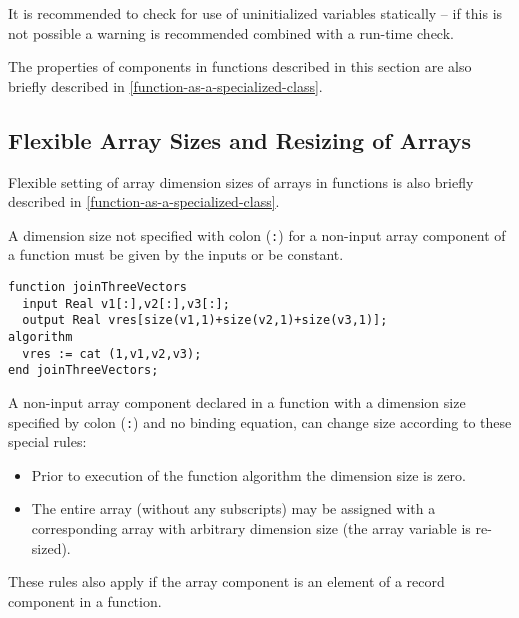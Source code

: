 \begin{nonnormative}
It is recommended to check for use of uninitialized variables statically -- if this is not possible a warning is recommended
combined with a run-time check.
\end{nonnormative}

\begin{nonnormative}
The properties of components in functions described in this
section are also briefly described in \cref{function-as-a-specialized-class}.
\end{nonnormative}

\subsection{Flexible Array Sizes and Resizing of Arrays}\label{flexible-array-sizes-and-resizing-of-arrays-in-functions}

\begin{nonnormative}
Flexible setting of array dimension sizes of arrays in
functions is also briefly described in \cref{function-as-a-specialized-class}.
\end{nonnormative}

A dimension size not specified with colon (\lstinline!:!) for a non-input array component of a function must be given by the inputs or be constant.

\begin{example}
\begin{lstlisting}[language=modelica]
function joinThreeVectors
  input Real v1[:],v2[:],v3[:];
  output Real vres[size(v1,1)+size(v2,1)+size(v3,1)];
algorithm
  vres := cat (1,v1,v2,v3);
end joinThreeVectors;
\end{lstlisting}
\end{example}

A non-input array component declared in a function with a dimension size specified by colon (\lstinline!:!) and no binding equation, can change size according to these special rules:
\begin{itemize}
\item
  Prior to execution of the function algorithm the dimension size is zero.
\item
  The entire array (without any subscripts) may be assigned with a corresponding array with arbitrary dimension size (the array variable is re-sized).
\end{itemize}

These rules also apply if the array component is an element of a record
component in a function.

